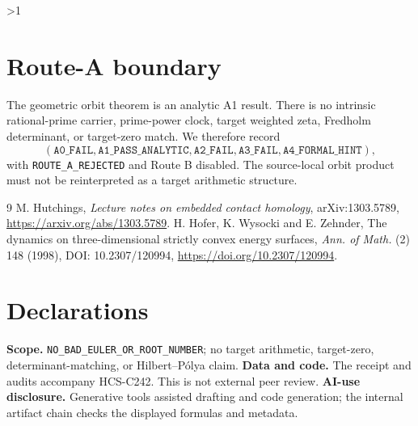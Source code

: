 \documentclass[10pt]{article}
\begin{document}
\ifnum\CRevisionRound>1
\section{Route-A boundary}
The geometric orbit theorem is an analytic A1 result.  There is no intrinsic
rational-prime carrier, prime-power clock, target weighted zeta, Fredholm
determinant, or target-zero match.  We therefore record
\[
(\mathtt{A0\_FAIL},\mathtt{A1\_PASS\_ANALYTIC},\mathtt{A2\_FAIL},
 \mathtt{A3\_FAIL},\mathtt{A4\_FORMAL\_HINT}),
\]
with \texttt{ROUTE\_A\_REJECTED} and Route B disabled.  The source-local
orbit product must not be reinterpreted as a target arithmetic structure.
\fi

\begin{thebibliography}{9}
 M. Hutchings, \emph{Lecture notes on embedded contact
homology}, arXiv:1303.5789, \url{https://arxiv.org/abs/1303.5789}.
 H. Hofer, K. Wysocki and E. Zehnder, The dynamics on
three-dimensional strictly convex energy surfaces, \emph{Ann. of Math.}
(2) 148 (1998), DOI: 10.2307/120994,
\url{https://doi.org/10.2307/120994}.
\end{thebibliography}

\section*{Declarations}
\textbf{Scope.} \texttt{NO\_BAD\_EULER\_OR\_ROOT\_NUMBER}; no target
arithmetic, target-zero, determinant-matching, or Hilbert--Pólya claim.
\textbf{Data and code.} The receipt and audits accompany HCS-C242. This is
not external peer review.  \textbf{AI-use disclosure.} Generative tools
assisted drafting and code generation; the internal artifact chain checks the
displayed formulas and metadata.
\end{document}
